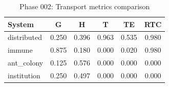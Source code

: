 \begin{table}[htbp]
\centering
\caption{Phase 002: Transport metrics comparison}
\begin{tabular}{lccccc}
\hline
System & G & H & T & TE & RTC \\
\hline
distributed & 0.250 & 0.396 & 0.963 & 0.535 & 0.980 \\
immune & 0.875 & 0.180 & 0.000 & 0.020 & 0.980 \\
ant_colony & 0.125 & 0.576 & 0.000 & 0.000 & 0.000 \\
institution & 0.250 & 0.497 & 0.000 & 0.000 & 0.000 \\
\hline
\end{tabular}
\end{table}
